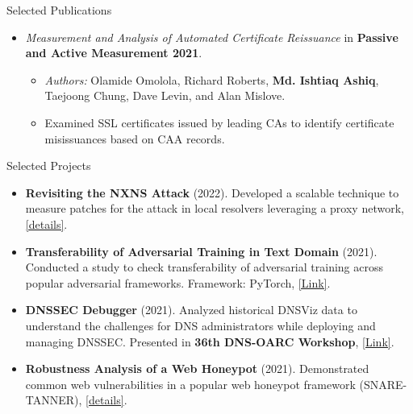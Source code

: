 \documentclass[]{mcdowellcv}
\begin{document}
\begin{cvsection}{Selected Publications}
\begin{cvsubsection}{}{}{}
\begin{itemize}
\begin{itemize}
				\end{itemize}
				\item \textit{Measurement and Analysis of Automated Certificate Reissuance} in \textbf{Passive and Active Measurement 2021}.
				\begin{itemize}
					\item \textit{Authors:} Olamide Omolola, Richard Roberts, \textbf{Md. Ishtiaq Ashiq}, Taejoong Chung, Dave Levin, and Alan Mislove.  %
					\item Examined SSL certificates issued by leading CAs to identify certificate misissuances based on CAA records.
				\end{itemize}
			\end{itemize}
		\end{cvsubsection}
	\end{cvsection}

	\begin{cvsection}{Selected Projects}
		\begin{cvsubsection}{}{}{}
			\begin{itemize}
				\item \textbf{Revisiting the NXNS Attack} (2022). Developed a scalable technique to measure patches for the attack in local resolvers leveraging a proxy network, \href{https://drive.google.com/file/d/1kuTSIHuNUYxmIKbR6MsSg3znMqx55mCP/view}{[details]}.
				\item \textbf{Transferability of Adversarial Training in Text Domain} (2021). Conducted a study to check transferability of adversarial training across popular adversarial frameworks. Framework: PyTorch, \href{https://github.com/Ashiq5/AdvTrainingExperiment}{[Link]}.
				\item \textbf{DNSSEC Debugger} (2021). Analyzed historical DNSViz data to understand the challenges for DNS administrators while deploying and managing DNSSEC. Presented in \textbf{36th DNS-OARC Workshop}, \href{https://indico.dns-oarc.net/event/40/contributions/891/attachments/857/1555/DNS-OARC-final.pdf}{[Link]}.
				\item \textbf{Robustness Analysis of a Web Honeypot} (2021). Demonstrated common web vulnerabilities in a popular web honeypot framework (SNARE-TANNER), \href{https://drive.google.com/file/d/1-FuDy-8xTE2TCRVV2RDuusnhAiLdgMeO/view?usp=sharing}{[details]}.
			\end{itemize}
		\end{cvsubsection}
	\end{cvsection}
\end{document}

